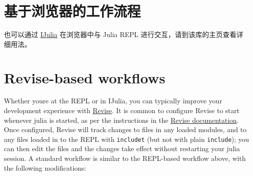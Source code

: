 \hypertarget{173246562791795014}{}


\section{基于浏览器的工作流程}



也可以通过 \href{https://github.com/JuliaLang/IJulia.jl}{IJulia} 在浏览器中与 Julia REPL 进行交互，请到该库的主页查看详细用法。



\hypertarget{940613295112476490}{}


\section{Revise-based workflows}



Whether you{\textquotesingle}re at the REPL or in IJulia, you can typically improve your development experience with \href{https://github.com/timholy/Revise.jl}{Revise}. It is common to configure Revise to start whenever julia is started, as per the instructions in the \href{https://timholy.github.io/Revise.jl/stable/}{Revise documentation}. Once configured, Revise will track changes to files in any loaded modules, and to any files loaded in to the REPL with \texttt{includet} (but not with plain \texttt{include}); you can then edit the files and the changes take effect without restarting your julia session. A standard workflow is similar to the REPL-based workflow above, with the following modifications:



